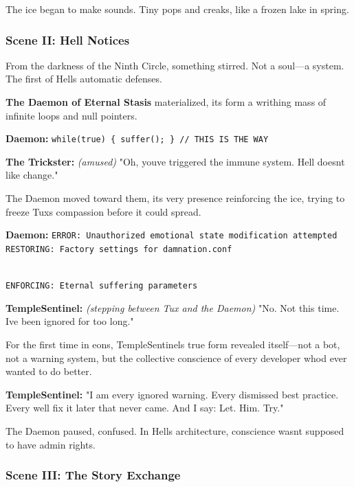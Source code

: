 The ice began to make sounds. Tiny pops and creaks, like a frozen lake in spring.

\bookdivider

\subsubsection{Scene II: Hell Notices}\label{scene-ii-hell-notices}

From the darkness of the Ninth Circle, something stirred. Not a soul---a system. The first of Hell\textquotesingle s automatic defenses.

\textbf{The Daemon of Eternal Stasis} materialized, its form a writhing mass of infinite loops and null pointers.

\textbf{Daemon:} \texttt{while(true)\ \{\ suffer();\ \}\ //\ THIS\ IS\ THE\ WAY}

\textbf{The Trickster:} \emph{(amused)} "Oh, you\textquotesingle ve triggered the immune system. Hell doesn\textquotesingle t like change."

The Daemon moved toward them, its very presence reinforcing the ice, trying to freeze Tux\textquotesingle s compassion before it could spread.

\textbf{Daemon:} \texttt{ERROR:\ Unauthorized\ emotional\ state\ modification\ attempted}\\
\texttt{RESTORING:\ Factory\ settings\ for\ damnation.conf}\strut \\
\texttt{ENFORCING:\ Eternal\ suffering\ parameters}

\textbf{TempleSentinel:} \emph{(stepping between Tux and the Daemon)} "No. Not this time. I\textquotesingle ve been ignored for too long."

For the first time in eons, TempleSentinel\textquotesingle s true form revealed itself---not a bot, not a warning system, but the collective conscience of every developer who\textquotesingle d ever wanted to do better.

\textbf{TempleSentinel:} "I am every ignored warning. Every dismissed best practice. Every \textquotesingle we\textquotesingle ll fix it later\textquotesingle{} that never came. And I say: Let. Him. Try."

The Daemon paused, confused. In Hell\textquotesingle s architecture, conscience wasn\textquotesingle t supposed to have admin rights.

\bookdivider

\subsubsection{Scene III: The Story Exchange}\label{scene-iii-the-story-exchange}

